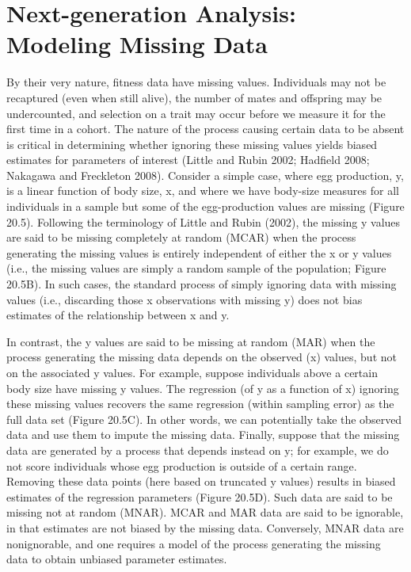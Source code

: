 \documentclass{article}
\begin{document}
\section{Next-generation Analysis: Modeling Missing Data}
By their very nature, fitness data have missing values. Individuals may not be recaptured (even when still alive), the number of mates and offspring may be undercounted, and selection on a trait may occur before we measure it for the first time in a cohort. The nature of the process causing certain data to be absent is critical in determining whether ignoring these missing values yields biased estimates for parameters of interest (Little and Rubin 2002; Hadfield 2008; Nakagawa and Freckleton 2008). Consider a simple case, where egg production, y, is a linear function of body size, x, and where we have body-size measures for all individuals in a sample but some of the egg-production values are missing (Figure 20.5). Following the terminology of Little and Rubin (2002), the missing y values are said to be missing completely at random (MCAR) when the process generating the missing values is entirely independent of either the x or y values (i.e., the missing values are simply a random sample of the population; Figure 20.5B). In such cases, the standard process of simply ignoring data with missing values (i.e., discarding those x observations with missing y) does not bias estimates of the relationship between x and y.

In contrast, the y values are said to be missing at random (MAR) when the process generating the missing data depends on the observed (x) values, but not on the associated y values. For example, suppose individuals above a certain body size have missing y values. The regression (of y as a function of x) ignoring these missing values recovers the same regression (within sampling error) as the full data set (Figure 20.5C). In other words, we can potentially take the observed data and use them to impute the missing data. Finally, suppose that the missing data are generated by a process that depends instead on y; for example, we do not score individuals whose egg production is outside of a certain range. Removing these data points (here based on truncated y values) results in biased estimates of the regression parameters (Figure 20.5D). Such data are said to be missing not at random (MNAR). MCAR and MAR data are said to be ignorable, in that estimates are not biased by the missing data. Conversely, MNAR data are nonignorable, and one requires a model of the process generating the missing data to obtain unbiased parameter estimates.
\end{document}
